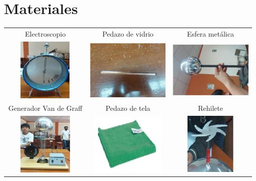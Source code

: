\section{Materiales}
\begin{table}[h]
	\begin{center}
		\begin{tabular}{|c|c|c|}
			\hline
			Electroscopio & Pedazo de vidrio & Esfera metálica \\
			\includegraphics[width=4cm, height=3cm]{imagenes/electoscopio.jpg} & \includegraphics[width=4cm, height=3cm]{imagenes/pedazovidrio.jpg} & \includegraphics[width=4cm, height=3cm]{imagenes/esferametalica.jpg}\\
			\hline
			Generador Van de Graff & Pedazo de tela & Rehilete \\
			\includegraphics[width=4cm, height=3cm]{imagenes/generador.jpg} & \includegraphics[width=4cm, height=3cm]{imagenes/tela.jpg} &
			\includegraphics[width=4cm, height=3cm]{imagenes/rehilete.jpg}\\
			\hline
		\end{tabular}
	\end{center}
\end{table}

